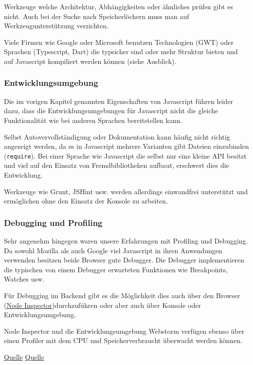 Werkzeuge welche Architektur, Abhängigkeiten oder ähnliches prüfen gibt
es nicht. Auch bei der Suche nach Speicherlöchern muss man auf
Werkzeugunterstützung verzichten.

Viele Firmen wie Google oder Microsoft benutzen Technologien (GWT) oder
Sprachen (Typescript, Dart) die typsicher sind oder mehr Struktur bieten
und auf Javascript kompiliert werden können (siehe Ausblick).

\subsubsection{Entwicklungsumgebung}\label{entwicklungsumgebung}

Die im vorigen Kapitel genannten Eigenschaften von Javascript führen
leider dazu, dass die Entwicklungsumgebungen für Javascript nicht die
gleiche Funktionalität wie bei anderen Sprachen bereitstellen kann.

Selbst Autovervollständigung oder Dokumentation kann häufig nicht
richtig angezeigt werden, da es in Javascript mehrere Varianten gibt
Dateien einzubinden (\texttt{require}). Bei einer Sprache wie Javascript
die selbst nur eine kleine API besitzt und viel auf den Einsatz von
Fremdbibliotheken aufbaut, erschwert dies die Entwicklung.

Werkzeuge wie Grunt, JSHint usw. werden allerdings einwandfrei
unterstützt und ermöglichen ohne den Einsatz der Konsole zu arbeiten.

\subsubsection{Debugging und Profiling}\label{debugging-und-profiling}

Sehr angenehm hingegen waren unsere Erfahrungen mit Profiling und
Debugging. Da sowohl Mozilla als auch Google viel Javascript in ihren
Anwendungen verwenden besitzen beide Browser gute Debugger. Die Debugger
implementieren die typischen von einem Debugger erwarteten Funktionen
wie Breakpoints, Watches usw.

Für Debugging im Backend gibt es die Möglichkeit dies auch über den
Browser (\href{https://github.com/node-inspector/node-inspector}{Node
Inspector})durchzuführen oder aber auch über Konsole oder
Entwicklungsumgebung.

Node Inspector und die Entwicklungsumgebung Webstorm verfügen ebenso
über einen Profiler mit dem CPU und Speicherverbraucht überwacht werden
können.

\href{https://developer.chrome.com/devtools/docs/javascript-memory-profiling}{Quelle}
\href{https://developer.chrome.com/devtools/docs/cpu-profiling}{Quelle}

